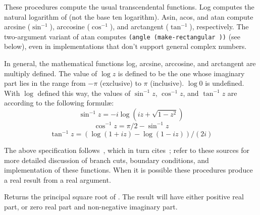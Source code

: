 \begin{entry}{%
}

These procedures 
compute the usual transcendental functions.  {\cf Log}
computes the natural logarithm of  (not the base ten logarithm).
{\cf Asin}, {\cf acos}, and {\cf atan} compute arcsine ($\sin^{-1}$),
arccosine ($\cos^{-1}$), and arctangent ($\tan^{-1}$), respectively.
The two-argument variant of {\cf atan} computes {\tt (angle
(make-rectangular  ))} (see below), even in implementations
that don't support general complex numbers.

In general, the mathematical functions log, arcsine, arccosine, and
arctangent are multiply defined.
The value of $\log z$ is defined to be the one whose imaginary
part lies in the range from $-\pi$ (exclusive) to $\pi$ (inclusive).
$\log 0$ is undefined.
With $\log$ defined this way, the values of $\sin^{-1} z$, $\cos^{-1} z$,
and $\tan^{-1} z$ are according to the following formul\ae:
$$\sin^{-1} z = -i \log (i z + \sqrt{1 - z^2})$$
$$\cos^{-1} z = \pi / 2 - \sin^{-1} z$$
$$\tan^{-1} z = (\log (1 + i z) - \log (1 - i z)) / (2 i)$$

The above specification follows~\cite{CLtL}, which in turn
cites~\cite{Penfield81}; refer to these sources for more detailed
discussion of branch cuts, boundary conditions, and implementation of
these functions.  When it is possible these procedures produce a real
result from a real argument.


\end{entry}


\begin{entry}{%
}

Returns the principal square root of .  The result will have
either positive real part, or zero real part and non-negative imaginary
part.
\end{entry}


